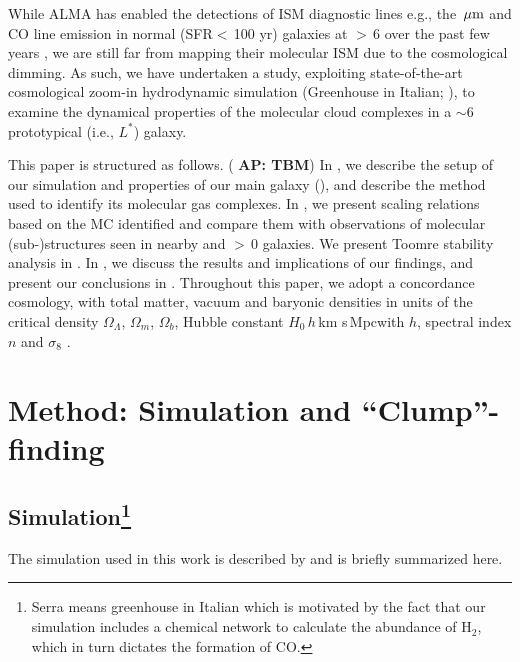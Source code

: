 \IfFileExists{emulateapjlegacy.cls}{\documentclass[iop]{emulateapjlegacy}}{\documentclass[iop]{emulateapj}}
\newcommand{\AP}[1]{({\bf \color{apcolor} AP: #1})}
\begin{document}
While ALMA has enabled the detections of
ISM diagnostic lines e.g., the \,$\mbox{$\mu$m}$ and CO line emission in
normal (SFR$<$\,100\,\Msun\,yr\pmOne) galaxies at \z$>$\,6 over the past few years \citep[e.g.,][]{Odorico18a, Carniani18b},
we are still far from mapping their molecular ISM due to the cosmological dimming.
As such, we have undertaken a study, exploiting
state-of-the-art cosmological zoom-in hydrodynamic simulation
 (Greenhouse in Italian; \citealt{Pallottini17a, Pallottini17b}), to examine
the dynamical properties of the molecular cloud complexes in a \z$\sim$6 prototypical (i.e., $L^*$) 
galaxy.

This paper is structured as follows.
\AP{TBM}
In , we describe the setup of our simulation and properties of our main galaxy (\flower),
and describe the method used to identify its molecular gas complexes.
In , we present scaling relations based on
the MC identified and compare them with observations of molecular
(sub-)structures seen in nearby and \z$>$\,0 galaxies.
We present Toomre stability analysis in .
In , we discuss the results and implications of our findings,
and present our conclusions in .
Throughout this paper, we adopt a concordance cosmology, with total matter, vacuum and baryonic densities
in units of the critical density $\Omega_{\Lambda}$, $\Omega_m$, $\Omega_b$,
Hubble constant $H_0$\,$h$\,km s\pmOne\,Mpc\pmOne with $h$,
spectral index $n$ and $\sigma_8$ \citep{Planck14a}.


\section{Method: Simulation and ``Clump''-finding} \label{sec:sim}


\subsection{ Simulation\footnote{Serra means greenhouse in Italian which is motivated by the
fact that our simulation includes a chemical network to calculate the abundance of H$_2$, which in turn
dictates the formation of CO.
}}
The simulation used in this work is described by \citealt{Pallottini17a, Pallottini17b} and is briefly summarized here.
\end{document}
